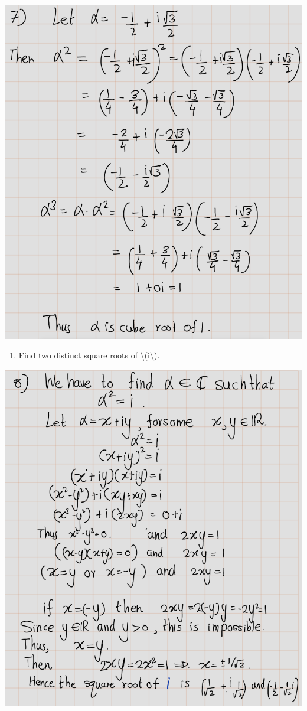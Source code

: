 \documentclass[
]{book}
\providecommand{\tightlist}{%
  \setlength{\itemsep}{0pt}\setlength{\parskip}{0pt}}
\theoremstyle{definition}
\theoremstyle{definition}
\theoremstyle{definition}
\theoremstyle{definition}
\theoremstyle{remark}
\begin{document}
\includegraphics{fig/Ex1A/Ex7.png}

\begin{enumerate}
\def\labelenumi{\arabic{enumi}.}
\setcounter{enumi}{7}
\tightlist
\item
  Find two distinct square roots of \textbackslash(i\textbackslash).
\end{enumerate}

\includegraphics{fig/Ex1A/Ex8.png}
\end{document}
